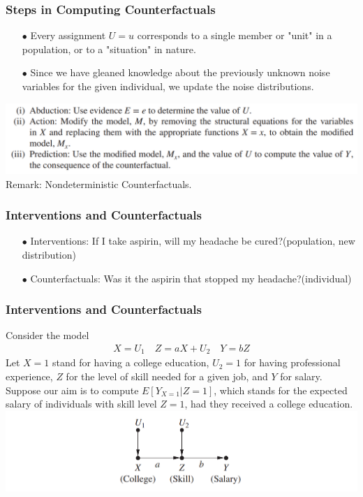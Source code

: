 \documentclass{beamer}
\begin{document}
\begin{frame}
    \frametitle{Steps in Computing Counterfactuals}
    \begin{itemize}
        \item[$\bullet$] Every assignment $U = u$ corresponds to a single member
        or "unit" in a population, or to a "situation" in nature.
        \item[$\bullet$] Since we have gleaned knowledge about the previously unknown noise variables for the given individual, 
        we update the noise distributions.
    \end{itemize} 
    \includegraphics[scale=0.6]{fig14.png}
    Remark: Nondeterministic Counterfactuals.
\end{frame}


\begin{frame}
    \frametitle{Interventions and Counterfactuals} 
    \begin{itemize}
        \item[$\bullet$] Interventions: If I take aspirin, will my headache be cured?(population, 
        new distribution)
        \item[$\bullet$] Counterfactuals: Was it the aspirin that stopped my headache?(individual)
    \end{itemize}
\end{frame}

\begin{frame}
    \frametitle{Interventions and Counterfactuals} 
    Consider the model
    \begin{align*}
        X=U_1\quad Z=aX+U_2\quad Y=bZ
    \end{align*}
    Let $X=1$ stand for having a college education, $U_2=1$ for having professional experience, $Z$ for the level of skill needed
    for a given job, and $Y$ for salary. Suppose our aim is to compute $E[Y_{X=1}|Z=1]$, which stands for the expected salary of individuals 
    with skill level $Z = 1$, had they received a college education.
    \includegraphics[scale=0.6]{fig4.png}
\end{frame}
\end{document}
